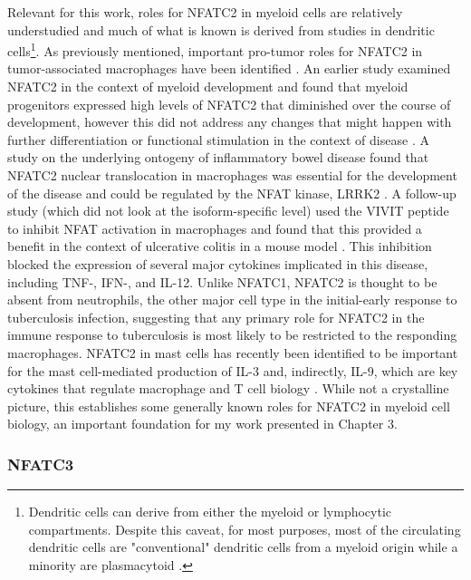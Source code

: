 Relevant for this work, roles for NFATC2 in myeloid cells are relatively understudied and much of what is known is derived from studies in dendritic cells\footnote{Dendritic cells can derive from either the myeloid or lymphocytic compartments. Despite this caveat, for most purposes, most of the circulating dendritic cells are "conventional" dendritic cells from a myeloid origin while a minority are plasmacytoid \citep{Shortman2002, Collins2018}.}. As previously mentioned, important pro-tumor roles for NFATC2 in tumor-associated macrophages have been identified \citep{Liu2018}. An earlier study examined NFATC2 in the context of myeloid development and found that myeloid progenitors expressed high levels of NFATC2 that diminished over the course of development, however this did not address any changes that might happen with further differentiation or functional stimulation in the context of disease \citep{Kiani2004}. A study on the underlying ontogeny of inflammatory bowel disease found that NFATC2 nuclear translocation in macrophages was essential for the development of the disease and could be regulated by the NFAT kinase, LRRK2 \citep{Liu2011}. A follow-up study (which did not look at the isoform-specific level) used the VIVIT peptide to inhibit NFAT activation in macrophages and found that this provided a benefit in the context of ulcerative colitis in a mouse model \citep{Elloumi2012}. This inhibition blocked the expression of several major cytokines implicated in this disease, including TNF-\textalpha, IFN-\textgamma, and IL-12. Unlike NFATC1, NFATC2 is thought to be absent from neutrophils, the other major cell type in the initial-early response to tuberculosis infection, suggesting that any primary role for NFATC2 in the immune response to tuberculosis is most likely to be restricted to the responding macrophages. NFATC2 in mast cells has recently been identified to be important for the mast cell-mediated production of IL-3 and, indirectly, IL-9, which are key cytokines that regulate macrophage and T cell biology \citep{Sabbaghi2021}. While not a crystalline picture, this establishes some generally known roles for NFATC2 in myeloid cell biology, an important foundation for my work presented in Chapter 3.

\subsubsection{NFATC3}\label{nfatc3}

